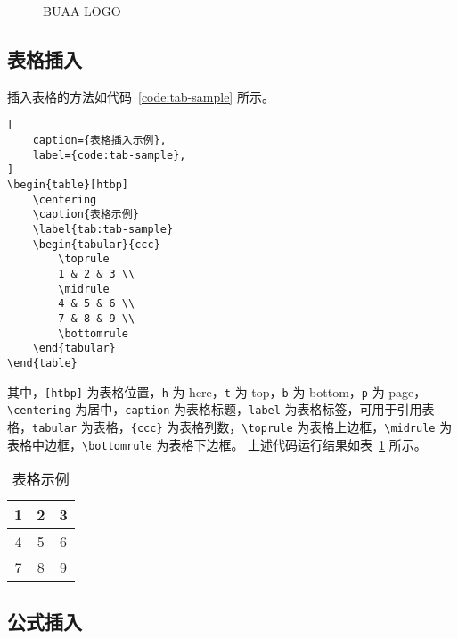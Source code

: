 \documentclass[master,AutoFakeBold=true]{buaathesisproposal}
\begin{document}
\begin{figure}[htbp]
    \centering
    \caption{BUAA LOGO}
    \label{fig:subfig-sample}
\end{figure}

\subsection{表格插入}

插入表格的方法如代码~\ref{code:tab-sample} 所示。
\begin{lstlisting}[
    caption={表格插入示例},
    label={code:tab-sample},
]
\begin{table}[htbp]
    \centering
    \caption{表格示例}
    \label{tab:tab-sample}
    \begin{tabular}{ccc}
        \toprule
        1 & 2 & 3 \\
        \midrule
        4 & 5 & 6 \\
        7 & 8 & 9 \\
        \bottomrule
    \end{tabular}
\end{table}
\end{lstlisting}
其中，\verb|[htbp]| 为表格位置，\verb|h| 为 here，\verb|t| 为 top，\verb|b| 为 bottom，\verb|p| 为 page，\verb|\centering| 为居中，\verb|caption| 为表格标题，\verb|label| 为表格标签，可用于引用表格，\verb|tabular| 为表格，\verb|{ccc}| 为表格列数，\verb|\toprule| 为表格上边框，\verb|\midrule| 为表格中边框，\verb|\bottomrule| 为表格下边框。
上述代码运行结果如表~\ref{tab:tab-sample} 所示。

\begin{table}[htbp]
    \centering
    \caption{表格示例}
    \label{tab:tab-sample}
    \begin{tabular}{ccc}
        \toprule
        1 & 2 & 3 \\
        \midrule
        4 & 5 & 6 \\
        7 & 8 & 9 \\
        \bottomrule
    \end{tabular}
\end{table}

\subsection{公式插入}
\end{document}
